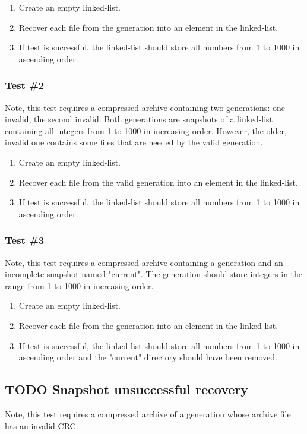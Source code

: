 \documentclass[11pt]{article}
\begin{document}
\begin{enumerate}
\item Create an empty linked-list.
\item Recover each file from the generation into an element in the linked-list.
\item If test is successful, the linked-list should store all numbers from 1 to 1000 in ascending order.
\end{enumerate}
\subsubsection{Test \#2}
\label{sec:org6a8744d}
Note, this test requires a compressed archive containing two generations: one invalid, the second invalid. Both generations are snapshots of a linked-list containing all integers from 1 to 1000 in increasing order. However, the older, invalid one contains some files that are needed by the valid generation. 

\begin{enumerate}
\item Create an empty linked-list.
\item Recover each file from the valid generation into an element in the linked-list.
\item If test is successful, the linked-list should store all numbers from 1 to 1000 in ascending order.
\end{enumerate}
\subsubsection{Test \#3}
\label{sec:orgae226a1}
Note, this test requires a compressed archive containing a generation and an incomplete snapshot named "current". The generation should store integers in the range from 1 to 1000 in increasing order.
\begin{enumerate}
\item Create an empty linked-list.
\item Recover each file from the generation into an element in the linked-list.
\item If test is successful, the linked-list should store all numbers from 1 to 1000 in ascending order and the "current" directory should have been removed.
\end{enumerate}
\subsection{{\bfseries\sffamily TODO} Snapshot unsuccessful recovery}
\label{sec:orgb130d74}
Note, this test requires a compressed archive of a generation whose archive file has an invalid CRC. 
\end{document}
